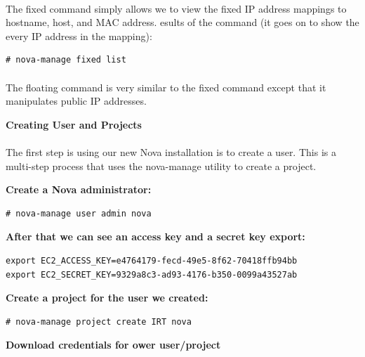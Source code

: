\paragraph{}The fixed command simply allows we to view the fixed IP address mappings to hostname, host, and MAC address.
esults of the command (it goes on to show the every IP address in the mapping):

\begin{lstlisting}[language={[Latex]TeX}, frame=single]
# nova-manage fixed list
\end{lstlisting}

\paragraph{}The floating command is very similar to the fixed command except that it manipulates public IP addresses.\par
\textbf{Creating User and Projects}

\paragraph{} The first step is using our new Nova installation is to create a user. 
This is a multi-step process that uses the nova-manage utility to create a project.\par
\textbf{Create a Nova administrator:}

\begin{lstlisting}[language={[Latex]TeX}, frame=single]
# nova-manage user admin nova
\end{lstlisting}
\newpage
\textbf{After that we can see an access key and a secret key export:}
\begin{lstlisting}[language={[Latex]TeX}, frame=single]
export EC2_ACCESS_KEY=e4764179-fecd-49e5-8f62-70418ffb94bb
export EC2_SECRET_KEY=9329a8c3-ad93-4176-b350-0099a43527ab
\end{lstlisting}

\textbf{Create a project for the user we created:}

\begin{lstlisting}[language={[Latex]TeX}, frame=single]
# nova-manage project create IRT nova
\end{lstlisting}

\textbf{Download credentials for ower user/project}

